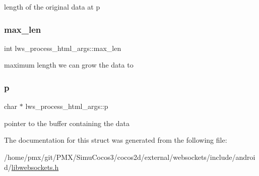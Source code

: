 length of the original data at p \mbox{\label{structlws__process__html__args_a8be7fd396a1942ea2449a2fda990ff99}} 
\subsubsection{\texorpdfstring{max\+\_\+len}{max\_len}}
{\footnotesize\ttfamily int lws\+\_\+process\+\_\+html\+\_\+args\+::max\+\_\+len}

maximum length we can grow the data to \mbox{\label{structlws__process__html__args_a7102ccce4bdc5abda196b5876589fa6c}} 
\subsubsection{\texorpdfstring{p}{p}}
{\footnotesize\ttfamily char $\ast$ lws\+\_\+process\+\_\+html\+\_\+args\+::p}

pointer to the buffer containing the data 

The documentation for this struct was generated from the following file\+:\begin{DoxyCompactItemize}
\item 
/home/pmx/git/\+P\+M\+X/\+Simu\+Cocos3/cocos2d/external/websockets/include/android/\hyperlink{_2cocos2d_2external_2websockets_2include_2android_2libwebsockets_8h}{libwebsockets.\+h}\end{DoxyCompactItemize}
